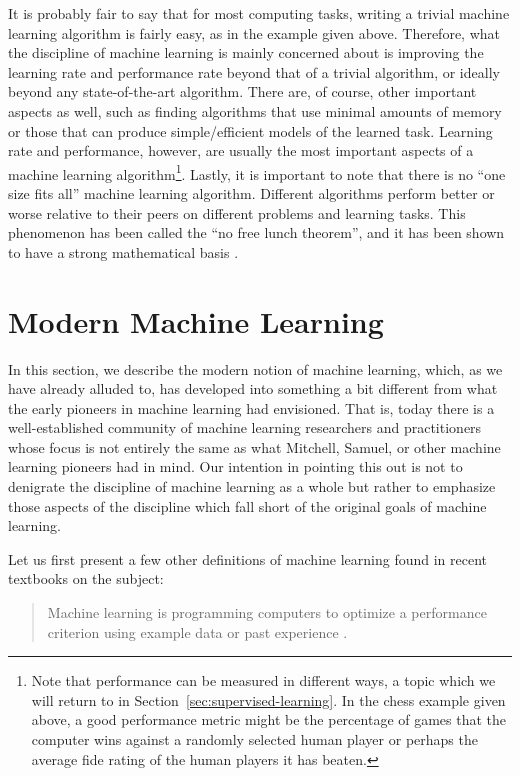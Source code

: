 It is probably fair to say that for most computing tasks, writing a trivial machine learning algorithm is fairly easy, as in the example given above. Therefore, what the discipline of machine learning is mainly concerned about is improving the learning rate and performance rate beyond that of a trivial algorithm, or ideally beyond any state-of-the-art algorithm. There are, of course, other important aspects as well, such as finding algorithms that use minimal amounts of memory or those that can produce simple/efficient models of the learned task. Learning rate and performance, however, are usually the most important aspects of a machine learning algorithm\footnote{Note that performance can be measured in different ways, a topic which we will return to in Section~\ref{sec:supervised-learning}. %
In the chess example given above, a good performance metric might be the percentage of games that the computer wins against a randomly selected human player or perhaps the average \gls{fide} rating of the human players it has beaten.}. Lastly, it is important to note that there is no ``one size fits all'' machine learning algorithm. Different algorithms perform better or worse relative to their peers on different problems and learning tasks. This phenomenon has been called the ``no free lunch theorem'', and it has been shown to have a strong mathematical basis \cite{wolpert1996lack}.

\section{Modern Machine Learning}
\label{sec:modern-machine-learning}

In this section, we describe the modern notion of machine learning, which, as we have already alluded to, has developed into something a bit different from what the early pioneers in machine learning had envisioned. That is, today there is a well-established community of machine learning researchers and practitioners whose focus is not entirely the same as what Mitchell, Samuel, or other machine learning pioneers had in mind. Our intention in pointing this out is not to denigrate the discipline of machine learning as a whole but rather to emphasize those aspects of the discipline which fall short of the original goals of machine learning. 

Let us first present a few other definitions of machine learning found in recent textbooks on the subject:
%
\begin{quote}
Machine learning is programming computers to optimize a performance criterion using example data or past experience \cite{alpaydin2014introduction}.
\end{quote}
%

